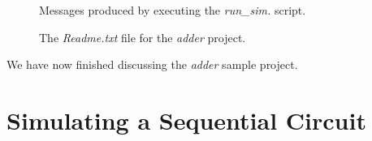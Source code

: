 {\begin{figure}[h]
\begin{center}
            \fi
        \else
        \fi
	\end{center}
          \caption{Messages produced by executing the {\it run\_sim.} script.}
	\label{fig:sim}
\end{figure}

\ifverilog
\begin{figure}[H]
\begin{center}
    \begin{minipage}[t]{17 cm}
        
    \end{minipage}
    \caption{The {\it Readme.txt} file for the {\it adder} project.}
	\label{fig:readme}
\end{center}
\end{figure}
\else
\begin{center}
\begin{minipage}[h]{17 cm}
    
\end{minipage}
\end{center}
\fi

\vspace{-0.25cm}
We have now finished discussing the {\it adder} sample project.

\section{Simulating a Sequential Circuit}

}
